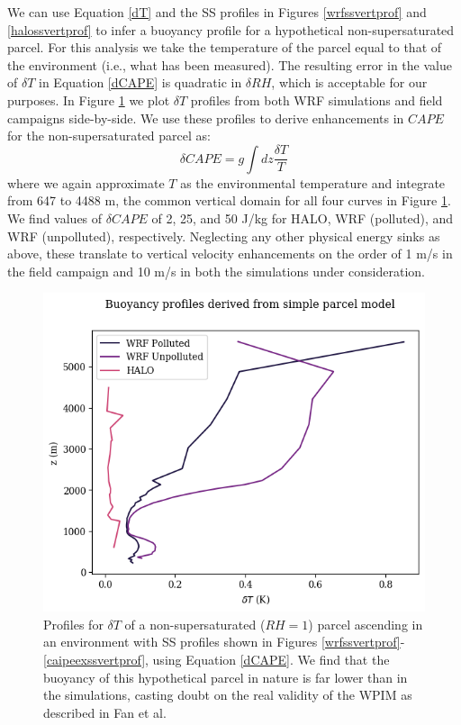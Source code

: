 \documentclass{article}
\begin{document}
We can use Equation \ref{dT} and the SS profiles in Figures \ref{wrfssvertprof} and \ref{halossvertprof} to infer a buoyancy profile for a hypothetical non-supersaturated parcel. For this analysis we take the temperature of the parcel equal to that of the environment (i.e., what has been measured). The resulting error in the value of $\delta T$ in Equation \ref{dCAPE} is quadratic in $\delta RH$, which is acceptable for our purposes. In Figure \ref{dTprofiles} we plot $\delta T$ profiles from both WRF simulations and field campaigns side-by-side. We use these profiles to derive enhancements in $CAPE$ for the non-supersaturated parcel as:
\begin{equation}
\label{dCAPE}
\delta CAPE = g \int dz \frac{\delta T}{T}
\end{equation}
where we again approximate $T$ as the environmental temperature and integrate from 647 to 4488 m, the common vertical domain for all four curves in Figure \ref{dTprofiles}. We find values of $\delta CAPE$ of 2, 25, and 50 J/kg for HALO, WRF (polluted), and WRF (unpolluted), respectively. Neglecting any other physical energy sinks as above, these translate to vertical velocity enhancements on the order of 1 m/s in the field campaign and 10 m/s in both the simulations under consideration.

\begin{figure}[ht]
    \centering
    \includegraphics[width=12cm]{wrf/combined_dT_profile_figure.png}
    \caption{Profiles for $\delta T$ of a non-supersaturated ($RH=1$) parcel ascending in an environment with SS profiles shown in Figures \ref{wrfssvertprof}-\ref{caipeexssvertprof}, using Equation \ref{dCAPE}. We find that the buoyancy of this hypothetical parcel in nature is far lower than in the simulations, casting doubt on the real validity of the WPIM as described in Fan et al.}
    \label{dTprofiles}
\end{figure}
\end{document}
